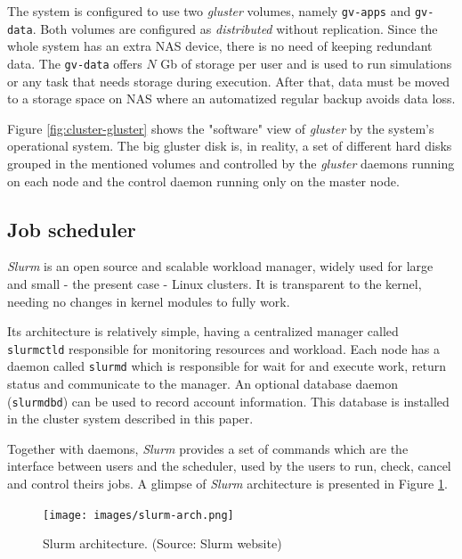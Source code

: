 \documentclass[twoside,a4paper,12pt,english]{inac19}
\begin{document}
The system is configured to use two \textit{gluster} volumes, namely \texttt{gv-apps} and \texttt{gv-data}. Both volumes
are configured as \textit{distributed} without replication. Since the whole system has an extra NAS device, there is
no need of keeping redundant data. The \texttt{gv-data} offers $N$ Gb of storage per user and is used to run simulations or any task that needs storage during execution. After that, data must be moved to a storage space on NAS where an automatized regular backup avoids data loss.

Figure \ref{fig:cluster-gluster} shows the "software" view of \textit{gluster} by the system's operational system. The big 
gluster disk is, in reality, a set of different hard disks grouped in the mentioned volumes and controlled by the 
\textit{gluster} daemons running on each node and the control daemon running only on the master node.

\subsection{Job scheduler}
\label{ssec:slurm}

\textit{Slurm}\cite{slurm} is an open source and scalable workload manager, widely used for large
and small - the present case - Linux clusters. It is transparent to the kernel, needing no changes in
kernel modules to fully work.

Its architecture is relatively simple, having a centralized manager called \texttt{slurmctld} responsible for
monitoring resources and workload. Each node has a daemon called \texttt{slurmd} which is responsible for
wait for and execute work, return status and communicate to the manager. An optional database daemon
(\texttt{slurmdbd}) can be used to record account information. This database is installed in the cluster
system described in this paper.

Together with daemons, \textit{Slurm} provides a set of commands which are the interface between users
and the scheduler, used by the users to run, check, cancel and control theirs jobs. A glimpse of \textit{Slurm}
architecture is presented in Figure \ref{fig:slurm}.

\begin{figure}[h] %
  \centering\texttt{[image: images/slurm-arch.png]}
  \caption{Slurm architecture. (Source: Slurm website)}
  \label{fig:slurm}
\end{figure}
\end{document}
